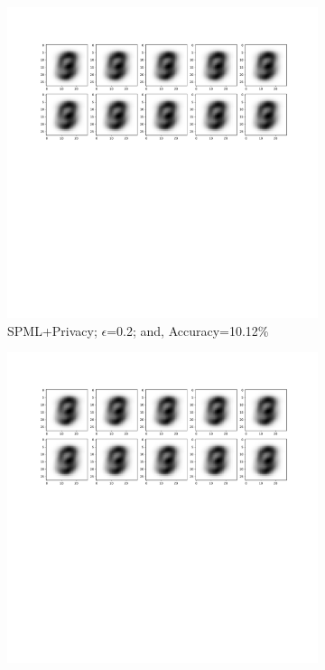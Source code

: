 \begin{figure}[h!]
\begin{subfigure}{.325\textwidth}
         \includegraphics[width=\textwidth]{images/Native_attack/Mnistattack.2.pdf}
         \vspace{-8em}
         \caption{SPML+Privacy; $\epsilon$=0.2; and, Accuracy=10.12\%}
         \label{default}
     \end{subfigure}
     \begin{subfigure}{.325\textwidth}
         \includegraphics[width=\textwidth]{images/Native_attack/Mnistattack1.pdf}

\end{subfigure}
\end{figure}
